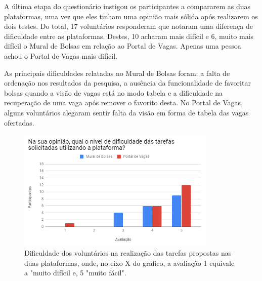 A última etapa do questionário instigou os participantes a compararem as duas plataformas, uma vez que eles tinham uma opinião mais sólida após realizarem os dois testes. Do total, 17 voluntários responderam que notaram uma diferença de dificuldade entre as plataformas. Destes, 10 acharam mais difícil e 6, muito mais difícil o Mural de Bolsas em relação ao Portal de Vagas. Apenas uma pessoa achou o Portal de Vagas mais difícil.

As principais dificuldades relatadas no Mural de Bolsas foram: a falta de ordenação nos resultados da pesquisa, a ausência da funcionalidade de favoritar bolsas quando a visão de vagas está no modo tabela e a dificuldade na recuperação de uma vaga após remover o favorito desta. No Portal de Vagas, alguns voluntários alegaram sentir falta da visão em forma de tabela das vagas ofertadas.

\begin{figure}[H]
    \caption{Dificuldade dos voluntários na realização das tarefas propostas nas duas plataformas, onde, no eixo X do gráfico, a avaliação 1 equivale a "muito difícil e, 5 "muito fácil".}
       	\begin{center}
            \includegraphics[width=0.85\textwidth]{figuras/avaliacao/ab-dificuldade.png}
        \end{center}
    \label{avalGrafABDesemp}
\end{figure} 

